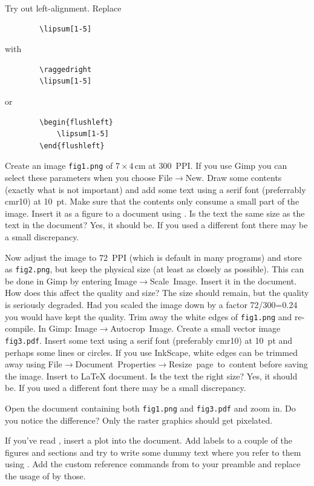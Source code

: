 {\begin{ExerciseList}
	\Exercise Try out left-alignment.
	\Answer Replace
	\begin{verbatim}
		\lipsum[1-5]
	\end{verbatim}
	with
	\begin{verbatim}
		\raggedright
		\lipsum[1-5]
	\end{verbatim}
	or
	\begin{verbatim}
		\begin{flushleft}
			\lipsum[1-5]
		\end{flushleft}
	\end{verbatim}

	\Exercise Create an image \verb|fig1.png| of $7\times 4\,\mathrm{cm}$ at 300~PPI. If you use Gimp you can select these parameters when you choose File$\rightarrow$New. Draw some contents (exactly what is not important) and add some text using a serif font (preferrably cmr10) at 10~pt. Make sure that the contents only consume a small part of the image. Insert it as a figure to a document using . Is the text the same size as the text in the document?
	\Answer Yes, it should be. If you used a different font there may be a small discrepancy.	
	
	\Exercise Now adjust the image to 72~PPI (which is default in many programs) and store as \verb|fig2.png|, but keep the physical size (at least as closely as possible). This can be done in Gimp by entering Image$\rightarrow$Scale~Image. Insert it in the document. How does this affect the quality and size?
	\Answer The size should remain, but the quality is seriously degraded. Had you scaled the image down by a factor 72/300=0.24 you would have kept the quality.
	\Exercise Trim away the white edges of \verb|fig1.png| and re-compile. In Gimp: Image$\rightarrow$Autocrop~Image.	
	\Exercise Create a small vector image \verb|fig3.pdf|. Insert some text using a serif font (preferably cmr10) at 10~pt and perhaps some lines or circles. If you use InkScape, white edges can be trimmed away using File$\rightarrow$Document~Properties$\rightarrow$Resize~page~to~content before saving the image. Insert to \LaTeX{} document. Is the text the right size?
	\Answer Yes, it should be. If you used a different font there may be a small discrepancy.	
	
	\Exercise Open the document containing both \verb|fig1.png| and \verb|fig3.pdf| and zoom in. Do you notice the difference?
	\Answer Only the raster graphics should get pixelated.
	
	\Exercise If you've read , insert a plot into the document.
	\Exercise Add labels to a couple of the figures and sections and try to write some dummy text where you refer to them using \latexin{\ref}.
	\Exercise Add the custom reference commands from  to your preamble and replace the usage of \latexin{\ref} by those.
\end{ExerciseList}

}

